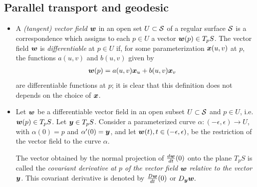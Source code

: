 \documentclass[11pt]{article}
\begin{document}
\subsection{Parallel transport and geodesic}
\begin{itemize}
\item  \begin{definition}
A \emph{(tangent) vector field} $\boldsymbol{w}$ in an open set $U \subset {\mathcal S}$ of a regular surface ${\mathcal S}$ is a correspondence which assigns to each $p\in U$ a vector $\boldsymbol{w}(p) \in T_{p}S$. The vector field $\boldsymbol{w}$ is \emph{differentiable} at $p\in U$ if, for some parameterization $\boldsymbol{x}(u,v)$ at $p$, the functions $a(u,v)$ and $b(u,v)$ given by 
\begin{align*}
\boldsymbol{w}(p) &= a(u,v)\boldsymbol{x}_{u} + b(u,v)\boldsymbol{x}_{v}
\end{align*}
are differentiable functions at $p$; it is clear that this definition does not depends on the choice of $\boldsymbol{x}$. 
\end{definition}


\item Let $\boldsymbol{w}$ be a differentiable vector field in an open subset $U \subset {\mathcal S}$ and $p\in U$, i.e. $\boldsymbol{w}(p) \in T_{p}S$. Let $\boldsymbol{y}\in T_{p}S$. Consider a parameterized curve $\alpha: (-\epsilon, \epsilon) \rightarrow U$, with $\alpha(0) = p$ and $\alpha'(0) = \boldsymbol{y}$, and let $\boldsymbol{w}(t), t\in (-\epsilon, \epsilon)$, be the restriction of the vector field to the curve $\alpha$. \begin{definition}
The vector obtained by the normal projection of $\frac{d\boldsymbol{w}}{dt}(0)$ onto the plane $T_{p}S$ is called the \emph{covariant derivative at $p$ of the vector field $\boldsymbol{w}$ relative to the vector $\boldsymbol{y}$.} This covariant derivative is denoted by $\frac{D\boldsymbol{w}}{dt}(0)$ or $D_{\boldsymbol{y}}\boldsymbol{w}.$
\end{definition}


\end{itemize}
\end{document}
